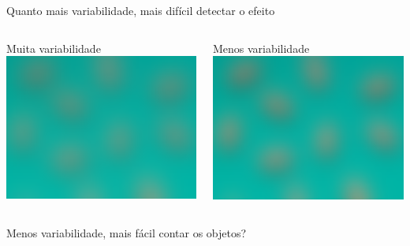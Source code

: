 \documentclass{beamer}
\begin{document}
\begin{frame}{\scriptsize Quanto mais variabilidade, mais difícil detectar o efeito}
  \bigskip
  \begin{columns}
    \begin{column}{5cm}
      \begin{exampleblock}{\scriptsize Muita variabilidade}
        \centering
        \includegraphics[width=\textwidth]{Cap10-11/analogia-var-poder-var100}
      \end{exampleblock}
    \end{column}
    \begin{column}{5cm}
      \begin{exampleblock}{\scriptsize Menos variabilidade}
        \centering
        \includegraphics[width=\textwidth]{Cap10-11/analogia-var-poder-var085}
      \end{exampleblock}
    \end{column}
  \end{columns}
  \vfill
  \centering
  \scriptsize
  Menos variabilidade, mais fácil contar os objetos?
\end{frame}
\end{document}
